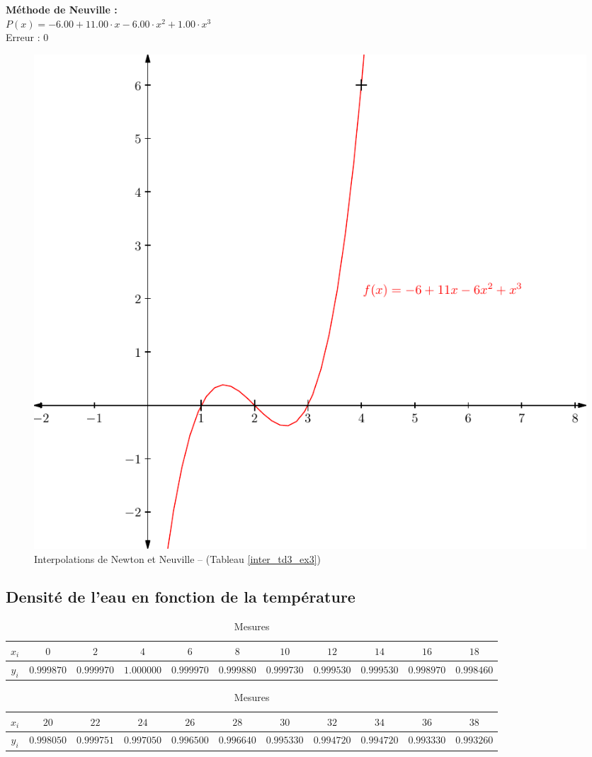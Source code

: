 \documentclass{report}
\begin{document}
	\noindent\textbf{Méthode de Neuville :}\\
	$P(x)= -6.00 + 11.00 \cdot x- 6.00 \cdot x^{2}  + 1.00 \cdot x^{3} $\\
	Erreur : $0$
	\newline
	\newline
	
	\begin{figure}[h]
	  \centering
	  \includegraphics[scale=0.7]{graphiques/pdf_output/inter_test1.pdf}
	  \caption{Interpolations de Newton et Neuville -- (Tableau \ref{inter_td3_ex3})}
	\end{figure}
      \newpage
      
      \subsection{Densité de l'eau en fonction de la température}      
	\begin{table}[h]
	  \centering
	  \begin{tabular}{| c | c | c | c | c | c | c | c | c | c | c |}
	    \hline 
	    $x_{i}$ & $0$ & $2$ & $4$ & $6$ & $8$ & $10$ & $12$ & $14$ & $16$ & $18$ \\
	    \hline 
	    $y_{i}$ & $0.999870$ & $0.999970$ & $1.000000$ & $0.999970$ & $0.999880$ & $0.999730$ & $0.999530$ & $0.999530$ & $0.998970$ & $0.998460$ \\ 
	    \hline 
	  \end{tabular}
	  \begin{tabular}{| c | c | c | c | c | c | c | c | c | c | c |}
	    \hline
	    $x_{i}$ & $20$ & $22$ & $24$ & $26$ & $28$ & $30$ & $32$ & $34$ & $36$ & $38$ \\ 
	    \hline
	    $y_{i}$ & $0.998050$ & $0.999751$ & $0.997050$ & $0.996500$ & $0.996640$ & $0.995330$ & $0.994720$ & $0.994720$ & $0.993330$ & $0.993260$ \\
	    \hline
	  \end{tabular}
	  \caption{Mesures}
	  \label{inter_tp2_ex1_densite}
	\end{table}
	
\end{document}
